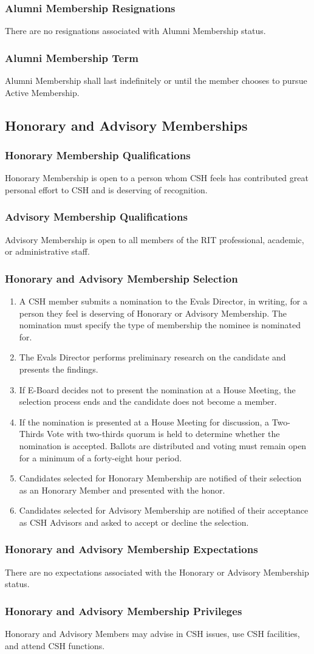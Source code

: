 \documentclass{article}
\newcommand{\asection}[1]{\subsection{#1} \label{#1}}
\newcommand{\asubsection}[1]{\subsubsection{#1} \label{#1}}
\begin{document}
\asubsection{Alumni Membership Resignations}
There are no resignations associated with Alumni Membership status.

\asubsection{Alumni Membership Term}
Alumni Membership shall last indefinitely or until the member chooses to pursue Active Membership.

\asection{Honorary and Advisory Memberships}

\asubsection{Honorary Membership Qualifications}
Honorary Membership is open to a person whom CSH feels has contributed great personal effort to CSH and is deserving of recognition.

\asubsection{Advisory Membership Qualifications}
Advisory Membership is open to all members of the RIT professional, academic, or administrative staff.

\asubsection{Honorary and Advisory Membership Selection}
\begin{enumerate}
	\item A CSH member submits a nomination to the Evals Director, in writing, for a person they feel is deserving of Honorary or Advisory Membership. The nomination must specify the type of membership the nominee is nominated for.
	\item The Evals Director performs preliminary research on the candidate and presents the findings.
	\item If E-Board decides not to present the nomination at a House Meeting, the selection process ends and the candidate does not become a member.
	\item If the nomination is presented at a House Meeting for discussion, a Two-Thirds Vote with two-thirds quorum is held to determine whether the nomination is accepted.
	      Ballots are distributed and voting must remain open for a minimum of a forty-eight hour period.
	\item Candidates selected for Honorary Membership are notified of their selection as an Honorary Member and presented with the honor.
	\item Candidates selected for Advisory Membership are notified of their acceptance as CSH Advisors and asked to accept or decline the selection.
\end{enumerate}

\asubsection{Honorary and Advisory Membership Expectations}
There are no expectations associated with the Honorary or Advisory Membership status.

\asubsection{Honorary and Advisory Membership Privileges}
Honorary and Advisory Members may advise in CSH issues, use CSH facilities, and attend CSH functions.
\end{document}
